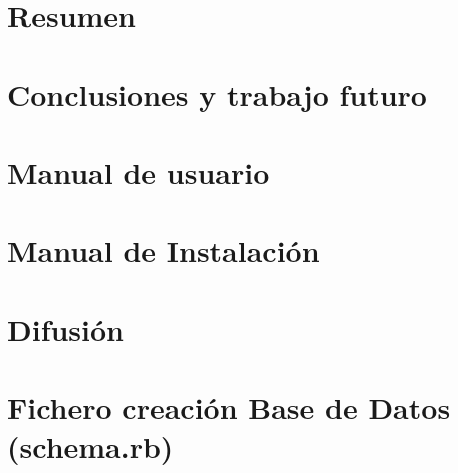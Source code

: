 \documentclass[a4paper,11pt]{book}
\begin{document}
\chapter{Resumen}
\label{cap:resumen}


\chapter{Conclusiones y trabajo futuro}
\label{cap:conclusiones}


\appendix
\cleardoublepage
\addappheadtotoc
\appendixpage
\chapter{Manual de usuario}
\label{cap:man_usuario}
\chapter{Manual de Instalación}
\label{cap:man_instalacion}

\chapter{Difusión}
\label{cap:difusion}


\chapter{Fichero creación Base de Datos (schema.rb)}
\label{cap:schema}


\backmatter

\cleardoublepage
{}
{}




\end{document}
